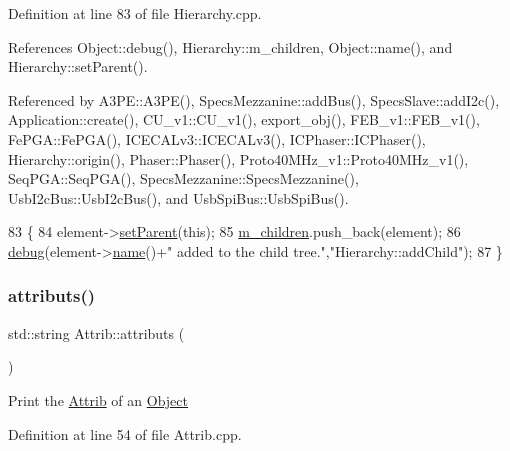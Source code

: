 Definition at line 83 of file Hierarchy.\+cpp.



References Object\+::debug(), Hierarchy\+::m\+\_\+children, Object\+::name(), and Hierarchy\+::set\+Parent().



Referenced by A3\+P\+E\+::\+A3\+P\+E(), Specs\+Mezzanine\+::add\+Bus(), Specs\+Slave\+::add\+I2c(), Application\+::create(), C\+U\+\_\+v1\+::\+C\+U\+\_\+v1(), export\+\_\+obj(), F\+E\+B\+\_\+v1\+::\+F\+E\+B\+\_\+v1(), Fe\+P\+G\+A\+::\+Fe\+P\+G\+A(), I\+C\+E\+C\+A\+Lv3\+::\+I\+C\+E\+C\+A\+Lv3(), I\+C\+Phaser\+::\+I\+C\+Phaser(), Hierarchy\+::origin(), Phaser\+::\+Phaser(), Proto40\+M\+Hz\+\_\+v1\+::\+Proto40\+M\+Hz\+\_\+v1(), Seq\+P\+G\+A\+::\+Seq\+P\+G\+A(), Specs\+Mezzanine\+::\+Specs\+Mezzanine(), Usb\+I2c\+Bus\+::\+Usb\+I2c\+Bus(), and Usb\+Spi\+Bus\+::\+Usb\+Spi\+Bus().


\begin{DoxyCode}
83                                           \{
84   element->\hyperlink{classHierarchy_a585ad1aeec16077a0e532ab8b4fc557b}{setParent}(\textcolor{keyword}{this});
85   \hyperlink{classHierarchy_a038816763941fd4a930504917f60483b}{m\_children}.push\_back(element);
86   \hyperlink{classObject_aac010553f022165573714b7014a15f0d}{debug}(element->\hyperlink{classObject_a300f4c05dd468c7bb8b3c968868443c1}{name}()+\textcolor{stringliteral}{" added to the child tree."},\textcolor{stringliteral}{"Hierarchy::addChild"});
87 \}
\end{DoxyCode}
\mbox{\label{classAttrib_aee7bbf16b144887f196e1341b24f8a26}} 
\subsubsection{\texorpdfstring{attributs()}{attributs()}}
{\footnotesize\ttfamily std\+::string Attrib\+::attributs (\begin{DoxyParamCaption}{ }\end{DoxyParamCaption})\hspace{0.3cm}{\ttfamily [inherited]}}

Print the \hyperlink{classAttrib}{Attrib} of an \hyperlink{classObject}{Object} 

Definition at line 54 of file Attrib.\+cpp.



